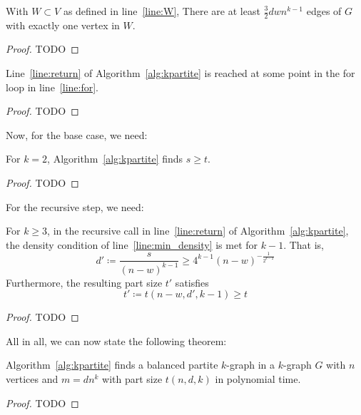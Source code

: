 \begin{lemma}
    With $W  \subset V$ as defined in line~\ref{line:W},
    There are at least $\frac{3}{2}dwn^{k-1}$ edges of $G$ with exactly one vertex in $W$.
    \begin{proof}
        TODO %
    \end{proof}
\end{lemma}

\begin{lemma}
    Line~\ref{line:return} of Algorithm~\ref{alg:kpartite} is reached at some point in the for
    loop in line~\ref{line:for}.
    \begin{proof}
        TODO %
    \end{proof}
\end{lemma}

Now, for the base case, we need:

\begin{lemma}
    For $k=2$, Algorithm~\ref{alg:kpartite} finds $s \geq t$.
    \begin{proof}
        TODO %
    \end{proof}
\end{lemma}

For the recursive step, we need:

\begin{lemma}
    For $k \geq 3$, in the recursive call in line~\ref{line:return} of Algorithm~\ref{alg:kpartite},
    the density condition of line~\ref{line:min_density} is met for $k-1$.
    That is,
    \[
        d' \coloneqq \frac{s}{(n-w)^{k-1}} \geq 4^{k-1} (n-w)^{-\frac{1}{2^{k-2}}}
    \]
    Furthermore,
    the resulting part size $t'$ satisfies
    \[
        t' \coloneqq t(n - w, d', k - 1) \geq t
    \]
    \begin{proof}
        TODO %
    \end{proof}

\end{lemma}

All in all, we can now state the following theorem:

\begin{theorem}
    Algorithm~\ref{alg:kpartite} finds a balanced partite $k$-graph in a $k$-graph $G$ with
    $n$ vertices and $m = d n^k$ with part size $t(n, d, k)$ in polynomial time.
    \begin{proof}
        TODO %
    \end{proof}
\end{theorem}





